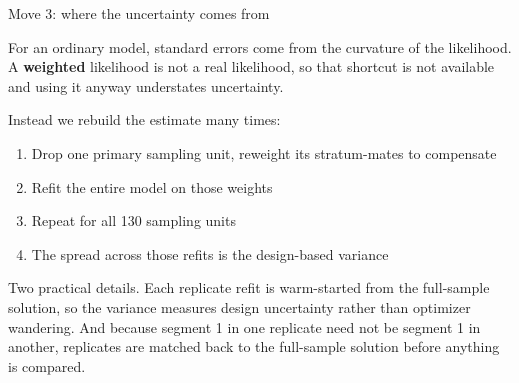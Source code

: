 \documentclass[
  ignorenonframetext,
  aspectratio=169,
]{beamer}
\newcommand{\kicker}[1]{\par\noindent{\footnotesize\color{vteal}\textbf{\MakeUppercase{#1}}}\par\vspace{0.4em}}
\begin{document}
\begin{frame}[shrink]{Move 3: where the uncertainty comes from}
\label{move-3-where-the-uncertainty-comes-from}
\kicker{replicate variance}

\small

For an ordinary model, standard errors come from the curvature of the
likelihood. A \textbf{weighted} likelihood is not a real likelihood, so
that shortcut is not available and using it anyway understates
uncertainty.

\vspace{0.5em}

Instead we rebuild the estimate many times:

\begin{enumerate}\itemsep2pt
  \item Drop one primary sampling unit, reweight its stratum-mates to compensate
  \item Refit the entire model on those weights
  \item Repeat for all 130 sampling units
  \item The spread across those refits is the design-based variance
\end{enumerate}

\vspace{0.5em}

\footnotesize

Two practical details. Each replicate refit is warm-started from the
full-sample solution, so the variance measures design uncertainty rather
than optimizer wandering. And because segment 1 in one replicate need
not be segment 1 in another, replicates are matched back to the
full-sample solution before anything is compared.

\end{frame}
\end{document}
